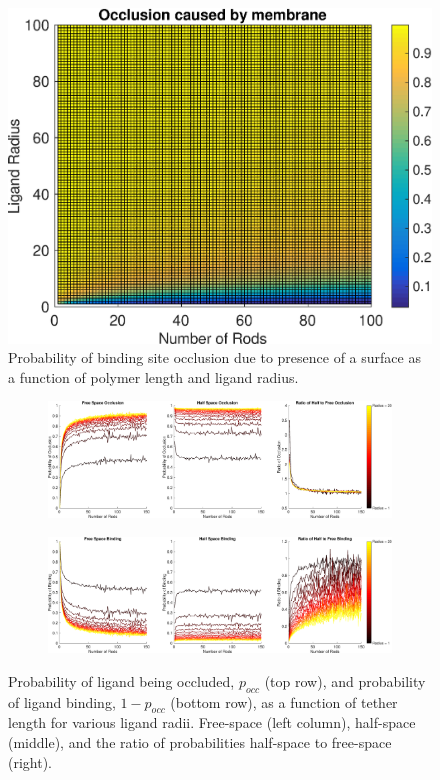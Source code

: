 \documentclass[../../AdvancementSummary.tex]{subfiles}
\begin{document}
\begin{figure}[H]
       \begin{center}
       		\includegraphics[width=0.7\linewidth]{ResultsFigures/MembraneCausedOcclusion/MembraneCausedOcclusionVSNVSirLigand.eps}
       \end{center}
       \caption{Probability of binding site occlusion due to presence of a surface as a function of polymer length and ligand radius. \label{fig: MembraneOcclusionVSNVSR}}
\end{figure}

\begin{figure}[h]
    \begin{center}
        \begin{subfigure}{\linewidth}
        		\includegraphics[width=\linewidth]{ResultsFigures/BindingSurfaceFactor/OcclusionVSN.eps}
        		\caption{}
        \end{subfigure}
        	\begin{subfigure}{\linewidth}
        		\includegraphics[width=\linewidth]{ResultsFigures/BindingSurfaceFactor/BindingVSN.eps}
        		\caption{}
        \end{subfigure}
        \caption{Probability of ligand being occluded, $p_{occ}$ (top row), and probability of ligand binding, $1-p_{occ}$ (bottom row), as a function of tether length for various ligand radii. Free-space (left column), half-space (middle), and the ratio of probabilities half-space to free-space (right). \label{fig: OcclusionVSN} }
       \end{center}
\end{figure}
       
\end{document}
